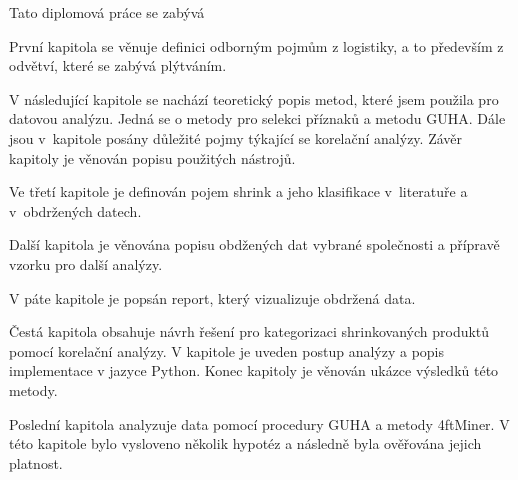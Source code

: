 Tato diplomová práce se zabývá %

První kapitola se věnuje definici odborným pojmům z logistiky, a to především z odvětví, které se zabývá plýtváním. 

V následující kapitole se nachází teoretický popis metod, které jsem použila pro datovou analýzu. Jedná se o metody pro selekci příznaků a metodu GUHA. Dále jsou v~kapitole posány důležité pojmy týkající se korelační analýzy. Závěr kapitoly je věnován popisu použitých nástrojů.

Ve třetí kapitole je definován pojem shrink a jeho klasifikace v~literatuře a v~obdržených datech.

Další kapitola je věnována popisu obdžených dat vybrané společnosti a přípravě vzorku pro další analýzy.

V páte kapitole je popsán report, který vizualizuje obdržená data.

Čestá kapitola obsahuje návrh řešení pro kategorizaci shrinkovaných produktů pomocí korelační analýzy. V kapitole je uveden postup analýzy a popis implementace v jazyce Python. Konec kapitoly je věnován ukázce výsledků této metody.

Poslední kapitola analyzuje data pomocí procedury GUHA a metody 4ftMiner. V této kapitole bylo vysloveno několik hypotéz a následně byla ověřována jejich platnost.





